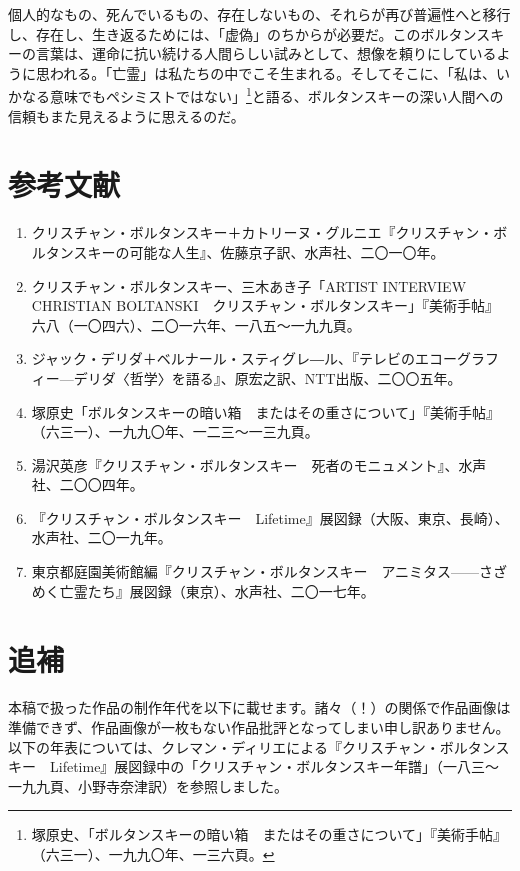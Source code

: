 \documentclass[b5j,twoside,twocolumn]{utarticle}
\begin{document}
個人的なもの、死んでいるもの、存在しないもの、それらが再び普遍性へと移行し、存在し、生き返るためには、「虚偽」のちからが必要だ。このボルタンスキーの言葉は、運命に抗い続ける人間らしい試みとして、想像を頼りにしているように思われる。「亡霊」は私たちの中でこそ生まれる。そしてそこに、「私は、いかなる意味でもペシミストではない」\footnote{塚原史、「ボルタンスキーの暗い箱　またはその重さについて」『美術手帖』（六三一）、一九九〇年、一三六頁。}と語る、ボルタンスキーの深い人間への信頼もまた見えるように思えるのだ。

\clearpage
{\small
\section*{参考文献}
\renewcommand{\labelenumi}{\pbox<y>{[\arabic{enumi}]}}
\begin{enumerate}
\item クリスチャン・ボルタンスキー＋カトリーヌ・グルニエ『クリスチャン・ボルタンスキーの可能な人生』、佐藤京子訳、水声社、二〇一〇年。
\item クリスチャン・ボルタンスキー、三木あき子「ARTIST INTERVIEW CHRISTIAN BOLTANSKI　クリスチャン・ボルタンスキー」『美術手帖』六八（一〇四六）、二〇一六年、一八五～一九九頁。
\item ジャック・デリダ＋ベルナール・スティグレ―ル、『テレビのエコーグラフィー—デリダ〈哲学〉を語る』、原宏之訳、NTT出版、二〇〇五年。
\item 塚原史「ボルタンスキーの暗い箱　またはその重さについて」『美術手帖』（六三一）、一九九〇年、一二三～一三九頁。
\item 湯沢英彦『クリスチャン・ボルタンスキー　死者のモニュメント』、水声社、二〇〇四年。
\item 『クリスチャン・ボルタンスキー　Lifetime』展図録（大阪、東京、長崎）、水声社、二〇一九年。
\item 東京都庭園美術館編『クリスチャン・ボルタンスキー　アニミタス------さざめく亡霊たち』展図録（東京）、水声社、二〇一七年。
\end{enumerate}
}

\section*{追補}
本稿で扱った作品の制作年代を以下に載せます。諸々（！）の関係で作品画像は準備できず、作品画像が一枚もない作品批評となってしまい申し訳ありません。以下の年表については、クレマン・ディリエによる『クリスチャン・ボルタンスキー　Lifetime』展図録中の「クリスチャン・ボルタンスキー年譜」（一八三～一九九頁、小野寺奈津訳）を参照しました。
\end{document}

